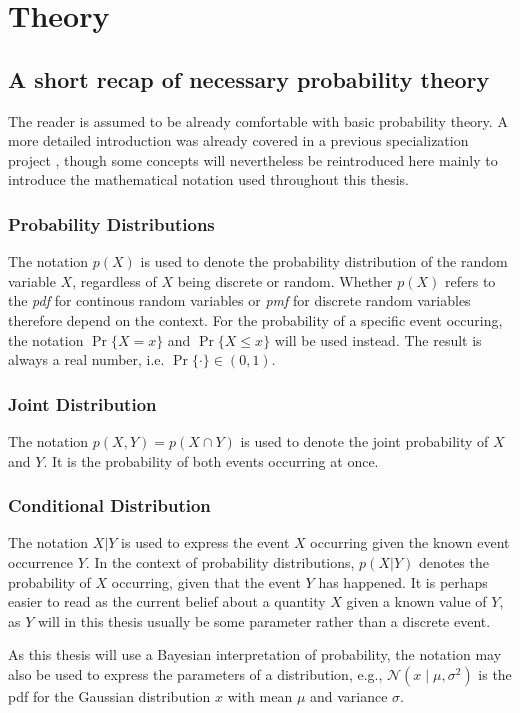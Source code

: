 \chapter{Theory}\label{chap:theory}

\section{A short recap of necessary probability theory}
The reader is assumed to be already comfortable with basic probability theory. A more detailed introduction was already covered in a previous specialization project \cite{mellbye}, though some concepts will nevertheless be reintroduced here mainly to introduce the mathematical notation used throughout this thesis. 

\subsection{Probability Distributions}
The notation $p(X)$ is used to denote the probability distribution of the random variable $X$, regardless of $X$ being discrete or random. Whether $p(X)$ refers to the \textit{\acrfull{pdf}} for continous random variables or \textit{\acrfull{pmf}} for discrete random variables therefore depend on the context. For the probability of a specific event occuring, the notation $\Pr\{X=x\}$ and $\Pr\{X \leq x\}$ will be used instead. The result is always a real number, i.e. $\Pr\{\cdot\} \in (0, 1)$. 

\subsection{Joint Distribution}
The notation $p(X, Y) = p(X \cap Y)$ is used to denote the joint probability of $X$ and $Y$. It is the probability of both events occurring at once.

\subsection{Conditional Distribution}
The notation $X | Y$ is used to express the event $X$ occurring given the known event occurrence $Y$. In the context of probability distributions, $p(X | Y)$ denotes the probability of $X$ occurring, given that the event $Y$ has happened. It is perhaps easier to read as the current belief about a quantity $X$ given a known value of $Y$, as $Y$ will in this thesis usually be some parameter rather than a discrete event. 

As this thesis will use a Bayesian interpretation of probability, the notation may also be used to express the parameters of a distribution, e.g., $\mathcal{N}(x \; | \;\mu, \sigma^2)$ is the \acrshort{pdf}  for the Gaussian distribution $x$ with mean $\mu$ and variance $\sigma$.

